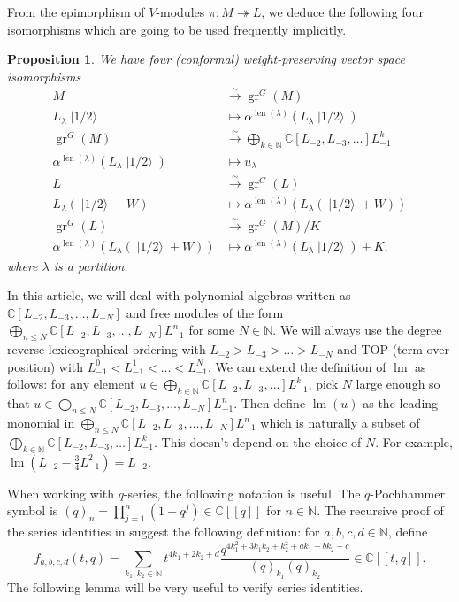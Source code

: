 \documentclass[a4paper, 12pt, reqno]{amsart}
\newtheorem{proposition}[theorem]{Proposition}
\theoremstyle{remark}
\numberwithin{equation}{subsection}
\DeclareMathOperator{\gr}{gr}
\DeclareMathOperator{\lm}{lm}
\DeclareMathOperator{\len}{len}
\DeclareMathOperator{\vachalf}{|1/2\rangle}
\begin{document}
From the epimorphism of $V$-modules $\pi: M \twoheadrightarrow L$, we deduce the following four isomorphisms which are going to be used frequently implicitly.

\begin{proposition}
  \label{prp:14}
  We have four (conformal) weight-preserving vector space isomorphisms
  \begin{align*}
    M &\xrightarrow{\sim} \gr^G(M) \\
    L_\lambda\vachalf &\mapsto \alpha^{\len(\lambda)}(L_\lambda\vachalf) \\
    \gr^G(M) &\xrightarrow{\sim} \bigoplus_{k \in \mathbb{N}}\mathbb{C}[L_{-2}, L_{-3}, \dots]L_{-1}^k \\
    \alpha^{\len(\lambda)}(L_\lambda\vachalf) &\mapsto u_\lambda \\
    L &\xrightarrow{\sim} \gr^G(L) \\
    L_\lambda(\vachalf + W) &\mapsto \alpha^{\len(\lambda)}(L_\lambda(\vachalf + W)) \\
    \gr^G(L) &\xrightarrow{\sim} \gr^G(M)/K \\
    \alpha^{\len(\lambda)}(L_\lambda(\vachalf + W)) &\mapsto \alpha^{\len(\lambda)}(L_\lambda\vachalf) + K,
  \end{align*}
  where $\lambda$ is a partition.
\end{proposition}

In this article, we will deal with polynomial algebras written as $\mathbb{C}[L_{-2}, L_{-3}, \dots, L_{-N}]$ and free modules of the form $\bigoplus_{n \le N}\mathbb{C}[L_{-2}, L_{-3}, \dots, L_{-N}]L_{-1}^n$ for some $N \in \mathbb{N}$.
We will always use the degree reverse lexicographical ordering with $L_{-2} > L_{-3} > \dots > L_{-N}$ and TOP (term over position) with $L_{-1}^0 < L_{-1}^1 < \dots < L_{-1}^N$.
We can extend the definition of $\lm$ as follows: for any element $u \in \bigoplus_{k \in \mathbb{N}}\mathbb{C}[L_{-2}, L_{-3}, \dots]L_{-1}^k$, pick $N$ large enough so that $u \in \bigoplus_{n \le N}\mathbb{C}[L_{-2}, L_{-3}, \dots, L_{-N}]L_{-1}^n$.
Then define $\lm(u)$ as the leading monomial in $\bigoplus_{n \le N}\mathbb{C}[L_{-2}, L_{-3}, \dots, L_{-N}]L_{-1}^n$ which is naturally a subset of $\bigoplus_{k \in \mathbb{N}}\mathbb{C}[L_{-2}, L_{-3}, \dots]L_{-1}^k$.
This doesn't depend on the choice of $N$.
For example, $\lm(L_{-2} - \frac{3}{4}L_{-1}^2) = L_{-2}$.

When working with $q$-series, the following notation is useful.
The $q$-Pochhammer symbol is $(q)_n = \prod_{j = 1}^n(1 - q^j) \in \mathbb{C}[[q]]$ for $n \in \mathbb{N}$.
The recursive proof of the series identities in \cite{andrews_singular_2022} suggest the following definition: for $a, b, c, d \in \mathbb{N}$, define
\begin{equation*}
  f_{a, b, c, d}(t, q) = \sum_{k_1, k_2 \in \mathbb{N}}t^{4k_1 + 2k_2 + d}\frac{q^{4k_1^2 + 3k_1k_2 + k_2^2 + ak_1 + bk_2 + c}}{(q)_{k_1}(q)_{k_2}} \in \mathbb{C}[[t, q]].
\end{equation*}
The following lemma will be very useful to verify series identities.
\end{document}

